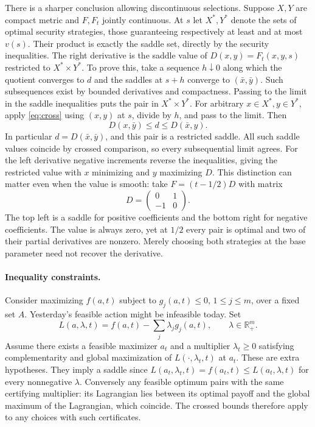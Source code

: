 \documentclass[11pt]{article}
\newcommand{\R}{\mathbb R}
\begin{document}
There is a sharper conclusion allowing discontinuous selections. Suppose \(X,Y\) are compact metric and \(F,F_t\) jointly continuous. At \(s\) let \(X^*,Y^*\) denote the sets of optimal security strategies, those guaranteeing respectively at least and at most \(v(s)\). Their product is exactly the saddle set, directly by the security inequalities. The right derivative is the saddle value of \(D(x,y)=F_t(x,y,s)\) restricted to \(X^*\times Y^*\). To prove this, take a sequence \(h\downarrow0\) along which the quotient converges to \(d\) and the saddles at \(s+h\) converge to \((\bar x,\bar y)\). Such subsequences exist by bounded derivatives and compactness. Passing to the limit in the saddle inequalities puts the pair in \(X^*\times Y^*\). For arbitrary \(x\in X^*,y\in Y^*\), apply \eqref{eq:cross} using \((x,y)\) at \(s\), divide by \(h\), and pass to the limit. Then
\[
 D(x,\bar y)\leq d\leq D(\bar x,y).
\]
In particular \(d=D(\bar x,\bar y)\), and this pair is a restricted saddle. All such saddle values coincide by crossed comparison, so every subsequential limit agrees. For the left derivative negative increments reverse the inequalities, giving the restricted value with \(x\) minimizing and \(y\) maximizing \(D\). This distinction can matter even when the value is smooth: take \(F=(t-1/2)D\) with matrix
\[
 D=\begin{pmatrix}0&1\\-1&0\end{pmatrix}.
\]
The top left is a saddle for positive coefficients and the bottom right for negative coefficients. The value is always zero, yet at \(1/2\) every pair is optimal and two of their partial derivatives are nonzero. Merely choosing both strategies at the base parameter need not recover the derivative.

\paragraph{Inequality constraints.}
Consider maximizing \(f(a,t)\) subject to \(g_j(a,t)\leq0\), \(1\leq j\leq m\), over a fixed set \(A\). Yesterday's feasible action might be infeasible today. Set
\[
 L(a,\lambda,t)=f(a,t)-\sum_j\lambda_j g_j(a,t),
 \qquad\lambda\in\R^m_+.
\]
Assume there exists a feasible maximizer \(a_t\) and a multiplier \(\lambda_t\geq0\) satisfying complementarity and global maximization of \(L(\cdot,\lambda_t,t)\) at \(a_t\). These are extra hypotheses. They imply a saddle since \(L(a_t,\lambda_t,t)=f(a_t,t)\leq L(a_t,\lambda,t)\) for every nonnegative \(\lambda\). Conversely any feasible optimum pairs with the same certifying multiplier: its Lagrangian lies between its optimal payoff and the global maximum of the Lagrangian, which coincide. The crossed bounds therefore apply to any choices with such certificates.
\end{document}

